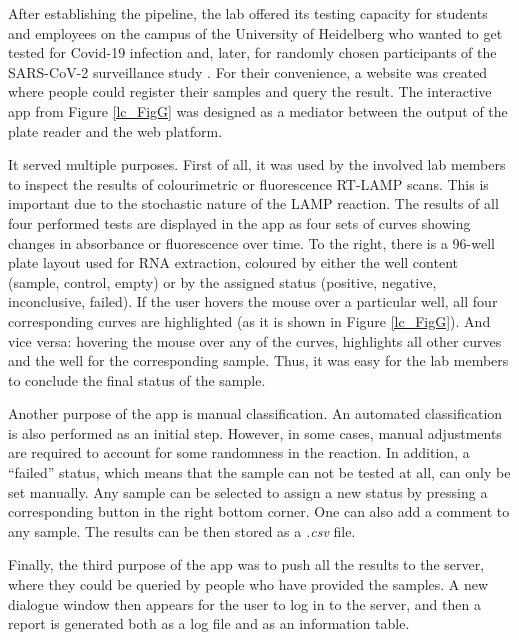 \documentclass[twocolumn,10pt]{article}
\begin{document}
After establishing the pipeline, the lab offered its testing capacity for students and employees on the campus of the University of Heidelberg who wanted to get tested for Covid-19 infection and, later, for randomly chosen participants of the SARS-CoV-2 surveillance study \citep{deckert_2021}. For their convenience, a website was created where people could register their samples and query the result. The interactive app from Figure \ref{lc_FigG} was designed as a mediator between the output of the plate reader and the web platform.

It served multiple purposes. First of all, it was used by the involved lab members to inspect the results of colourimetric or fluorescence RT-LAMP scans. This is important due to the stochastic nature of the LAMP reaction. The results of all four performed tests are displayed in the app as four sets of curves showing changes in absorbance or fluorescence over time. To the right, there is a 96-well plate layout used for RNA extraction, coloured by either the well content (sample, control, empty) or by the assigned status (positive, negative, inconclusive, failed). If the user hovers the mouse over a particular well, all four corresponding curves are highlighted (as it is shown in Figure \ref{lc_FigG}). And vice versa: hovering the mouse over any of the curves, highlights all other curves and the well for the corresponding sample. Thus, it was easy for the lab members to conclude the final status of the sample.

Another purpose of the app is manual classification. An automated classification is also performed as an initial step. However, in some cases, manual adjustments are required to account for some randomness in the reaction. In addition, a ``failed'' status, which means that the sample can not be tested at all, can only be set manually. Any sample can be selected to assign a new status by pressing a corresponding button in the right bottom corner. One can also add a comment to any sample. The results can be then stored as a \emph{.csv} file.

Finally, the third purpose of the app was to push all the results to the server, where they could be queried by people who have provided the samples. A new dialogue window then appears for the user to log in to the server, and then a report is generated both as a log file and as an information table.
\end{document}
